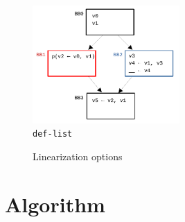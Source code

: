 \documentclass[12pt]{article}
\begin{document}
\begin{figure}[t!]
  \centering
  \includegraphics[width=0.5\textwidth]{cfg}
  \caption{\texttt{def-list} }
\end{figure}

\begin{figure}[t!]
  \centering
   \hfill
  \caption{Linearization options}
  \label{fig:linearization-options}
\end{figure}

\section{Algorithm}
\end{document}
